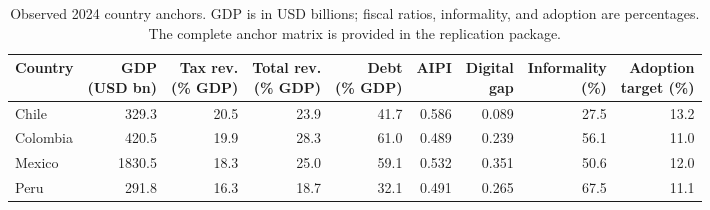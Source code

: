 \begingroup
\begin{table}[!htbp]
\centering
\caption{Observed 2024 country anchors. GDP is in USD billions; fiscal ratios, informality, and adoption are percentages. The complete anchor matrix is provided in the replication package.}\label{tab:results_anchors}
\fontsize{7.2}{8.6}\selectfont
\setlength{\tabcolsep}{2.4pt}
\begin{tabular}{@{}lrrrrrrrr@{}}
\toprule
Country & \shortstack{GDP\\(USD bn)} & \shortstack{Tax rev.\\(\% GDP)} & \shortstack{Total rev.\\(\% GDP)} & \shortstack{Debt\\(\% GDP)} & AIPI & \shortstack{Digital\\gap} & \shortstack{Informality\\(\%)} & \shortstack{Adoption\\target (\%)} \\
\midrule
Chile & 329.3 & 20.5 & 23.9 & 41.7 & 0.586 & 0.089 & 27.5 & 13.2 \\
Colombia & 420.5 & 19.9 & 28.3 & 61.0 & 0.489 & 0.239 & 56.1 & 11.0 \\
Mexico & 1830.5 & 18.3 & 25.0 & 59.1 & 0.532 & 0.351 & 50.6 & 12.0 \\
Peru & 291.8 & 16.3 & 18.7 & 32.1 & 0.491 & 0.265 & 67.5 & 11.1 \\
\bottomrule
\end{tabular}
\end{table}
\endgroup
